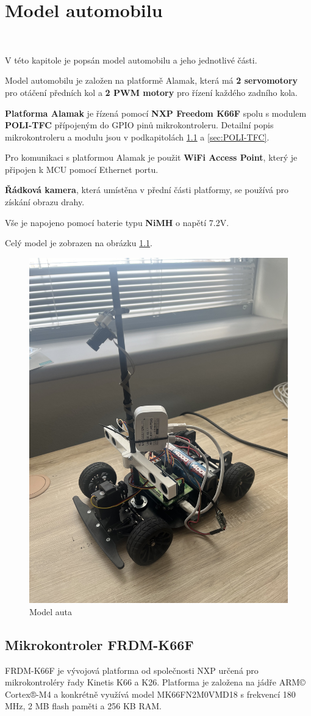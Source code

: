 \chapter{Model automobilu}
\label{sec:CarModel} \

V této kapitole je popsán model automobilu a jeho jednotlivé části.

Model automobilu je založen na platformě Alamak, která má
\textbf{2 servomotory} pro otáčení předních kol a
\textbf{2 PWM motory} pro řízení každého
zadního kola.

\textbf{Platforma Alamak} je řízená pomocí \textbf{NXP Freedom K66F}\cite{frdmk66UserGuide} spolu
s modulem \textbf{POLI-TFC} přípojeným do GPIO pinů mikrokontroleru.
Detailní popis mikrokontroleru a modulu jsou v podkapitolách \ref{sec:FRDM-K66F}
a \ref{sec:POLI-TFC}.

Pro komunikaci s platformou Alamak je použit \textbf{WiFi Access Point}, který je připojen k MCU
pomocí Ethernet portu.

\textbf{Řádková kamera}, která umístěna v přední části platformy,
se používá pro získání obrazu drahy.

Vše je napojeno pomocí baterie typu \textbf{NiMH} o napětí 7.2V.

Celý model je zobrazen na obrázku \ref{fig:car}.
\begin{figure}[h]
    \centering
    \includegraphics[width=0.45\linewidth, angle=-90]{Figures/car.jpeg}
    \caption{Model auta}
    \label{fig:car}
\end{figure}

\section{Mikrokontroler FRDM-K66F}
\label{sec:FRDM-K66F}
FRDM-K66F je vývojová platforma od společnosti NXP určená pro mikrokontroléry řady Kinetis K66 a K26.
Platforma je založena na jádře ARM© Cortex®-M4 a
konkrétně využívá model MK66FN2M0VMD18 s frekvencí 180 MHz, 2 MB flash paměti a 256 KB RAM.

